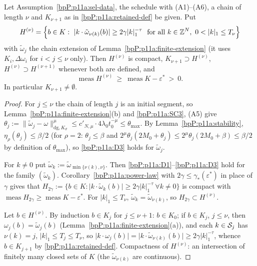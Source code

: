 \begin{lemma}\label{bpP:p11a:finite-measure}
Let Assumption~\ref{bpP:p11a:sel-data}, the schedule with (A1)--(A6), a chain of length $\nu$ and $K_{\nu+1}$ as in \eqref{bpP:p11a:retained-def} be given. Put
\[H^{(\nu)}=\Bigl\{b\in K:\ \lvert k\cdot\tilde\omega_{\nu(k)}(b)\rvert\ge2\gamma\lvert k\rvert_1^{-\tau}\ \text{ for all }k\in\Z^N,\ 0<\lvert k\rvert_1\le T_\nu\Bigr\}\]
with $\tilde\omega_j$ the chain extension of Lemma~\ref{bpP:p11a:finite-extension} (it uses $K_i,\Delta\omega_i$ for $i<j\le\nu$ only). Then $H^{(\nu)}$ is compact, $K_{\nu+1}\supset H^{(\nu)}$, $H^{(\nu)}\supset H^{(\nu+1)}$ whenever both are defined, and
\[\operatorname{meas}H^{(\nu)}\ \ge\ \operatorname{meas}K-\varepsilon^*\ >\ 0 .\]
In particular $K_{\nu+1}\ne\emptyset$.
\end{lemma}
\begin{proof}
\label{stepP:p11a:fm-close} For $j\le\nu$ the chain of length $j$ is an initial segment, so Lemma~\ref{bpP:p11a:finite-extension}(b) and \ref{bpP:p11a:SC3}, (A5) give $\theta_j:=\lVert\tilde\omega_j-\omega\rVert^\mu_{\mathrm{dg},K_\vartheta}\le c'_{N,\mu}\cdot4\lambda_0t_0^{-\mu}\le\theta_{\max}$. By Lemma~\ref{bpP:p11a:stability}, $\eta_\rho(\theta_j)\le\beta/2$ (for $\rho=2$: $\theta_j\le\beta$ and $2^\mu\theta_j(2M_0+\theta_j)\le2^\mu\theta_j(2M_0+\beta)\le\beta/2$ by definition of $\theta_{\max}$), so \ref{bpP:p11a:D3} holds for $\tilde\omega_j$.

\label{stepP:p11a:fm-family} For $k\ne0$ put $\tilde\omega_k:=\tilde\omega_{\min\{\nu(k),\nu\}}$. Then \ref{bpP:p11a:D1}--\ref{bpP:p11a:D3} hold for the family $(\tilde\omega_k)$. Corollary~\ref{bpP:p11a:power-law} with $2\gamma\le\gamma_*(\varepsilon^*)$ in place of $\gamma$ gives that $H_{2\gamma}:=\{b\in K:\lvert k\cdot\tilde\omega_k(b)\rvert\ge2\gamma\lvert k\rvert_1^{-\tau}\ \forall k\ne0\}$ is compact with $\operatorname{meas}H_{2\gamma}\ge\operatorname{meas}K-\varepsilon^*$. For $\lvert k\rvert_1\le T_\nu$, $\tilde\omega_k=\tilde\omega_{\nu(k)}$, so $H_{2\gamma}\subset H^{(\nu)}$.

\label{stepP:p11a:fm-incl} Let $b\in H^{(\nu)}$. By induction $b\in K_j$ for $j\le\nu+1$: $b\in K_0$; if $b\in K_j$, $j\le\nu$, then $\omega_j(b)=\tilde\omega_j(b)$ (Lemma~\ref{bpP:p11a:finite-extension}(a)), and each $k\in\mathcal S_j$ has $\nu(k)=j$, $\lvert k\rvert_1\le T_j\le T_\nu$, so $\lvert k\cdot\omega_j(b)\rvert=\lvert k\cdot\tilde\omega_{\nu(k)}(b)\rvert\ge2\gamma\lvert k\rvert_1^{-\tau}$, whence $b\in K_{j+1}$ by \eqref{bpP:p11a:retained-def}. Compactness of $H^{(\nu)}$: an intersection of finitely many closed sets of $K$ (the $\tilde\omega_{\nu(k)}$ are continuous).
\end{proof}

